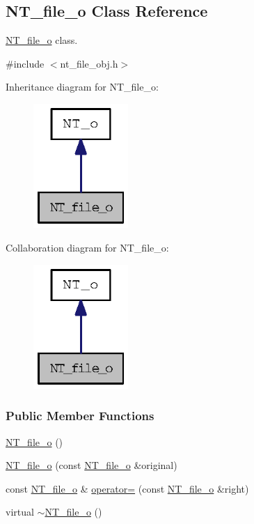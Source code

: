 \subsection{NT\_\-file\_\-o Class Reference}
\label{class_n_t__file__o}


\hyperlink{class_n_t__file__o}{NT\_\-file\_\-o} class.  




{\ttfamily \#include $<$nt\_\-file\_\-obj.h$>$}



Inheritance diagram for NT\_\-file\_\-o:
\nopagebreak
\begin{figure}[H]
\begin{center}
\leavevmode
\includegraphics[width=102pt]{class_n_t__file__o__inherit__graph}
\end{center}
\end{figure}


Collaboration diagram for NT\_\-file\_\-o:
\nopagebreak
\begin{figure}[H]
\begin{center}
\leavevmode
\includegraphics[width=102pt]{class_n_t__file__o__coll__graph}
\end{center}
\end{figure}
\subsubsection*{Public Member Functions}
\begin{DoxyCompactItemize}
\item 
\hyperlink{class_n_t__file__o_a65ffd9e6287b317bf1b39532f6b8f67f}{NT\_\-file\_\-o} ()
\item 
\hyperlink{class_n_t__file__o_a5a24dd21907c62b5bff0740f22949947}{NT\_\-file\_\-o} (const \hyperlink{class_n_t__file__o}{NT\_\-file\_\-o} \&original)
\item 
const \hyperlink{class_n_t__file__o}{NT\_\-file\_\-o} \& \hyperlink{class_n_t__file__o_addc3936f9da0ff2f07af412fc17baeec}{operator=} (const \hyperlink{class_n_t__file__o}{NT\_\-file\_\-o} \&right)
\item 
virtual \hyperlink{class_n_t__file__o_ae5f15150db4856653228c85554fdad46}{$\sim$NT\_\-file\_\-o} ()
\end{DoxyCompactItemize}


